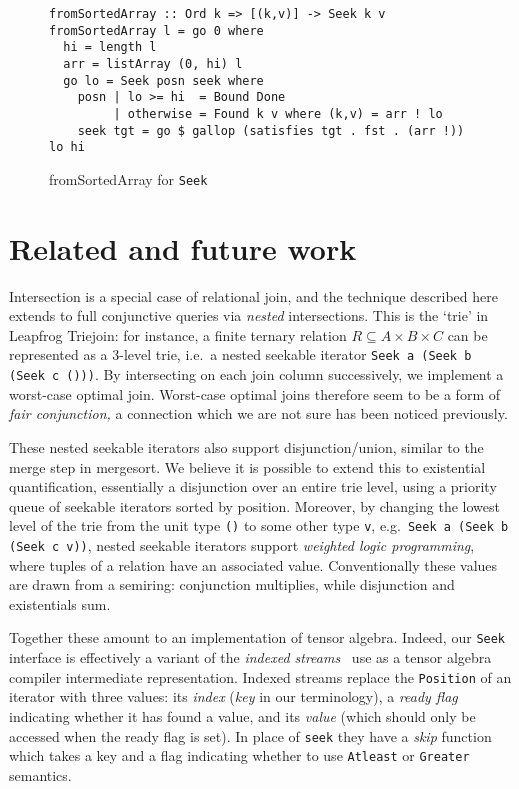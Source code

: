 \documentclass[acmsmall,screen,review,anonymous,dvipsnames,svgnames]{acmart}
\newcommand\hask[1]{\texttt{#1}}
\newcommand\ttt\texttt
\newcommand\todo[1]{{\color{Orange}#1}}
\renewcommand\todo[1]{{\color{IndianRed}#1}}
\renewcommand\todo[1]{\ignorespaces}
\begin{document}
\begin{figure}
  \begin{verbatim}
fromSortedArray :: Ord k => [(k,v)] -> Seek k v
fromSortedArray l = go 0 where
  hi = length l
  arr = listArray (0, hi) l
  go lo = Seek posn seek where
    posn | lo >= hi  = Bound Done
         | otherwise = Found k v where (k,v) = arr ! lo
    seek tgt = go $ gallop (satisfies tgt . fst . (arr !)) lo hi
  \end{verbatim}
  \caption{fromSortedArray for \hask{Seek}}
  \label{fig:seek-fromsortedarray}
\end{figure}


\section{Related and future work}

Intersection is a special case of relational join, and the technique described here extends to full conjunctive queries via \emph{nested} intersections.
This is the `trie' in Leapfrog Triejoin: for instance, a finite ternary relation $R \subseteq A \times B \times C$ can be represented as a 3-level trie, i.e.\ a nested seekable iterator \hask{Seek a (Seek b (Seek c ()))}.
By intersecting on each join column successively, we implement a worst-case optimal join.
Worst-case optimal joins therefore seem to be a form of \emph{fair conjunction,} a connection which we are not sure has been noticed previously.

These nested seekable iterators also support disjunction/union, similar to the merge step in mergesort.
We believe it is possible to extend this to existential quantification, essentially a disjunction over an entire trie level, using a priority queue of seekable iterators sorted by position.
Moreover, by changing the lowest level of the trie from the unit type \ttt{()} to some other type \ttt{v}, e.g.\ \hask{Seek a (Seek b (Seek c v))}, nested seekable iterators support \emph{weighted logic programming}, where tuples of a relation have an associated value.
Conventionally these values are drawn from a semiring: conjunction multiplies, while disjunction and existentials sum.

Together these amount to an implementation of tensor algebra.
Indeed, our \hask{Seek} interface is effectively a variant of the \emph{indexed streams}~\citet{indexed-streams} use as a tensor algebra compiler intermediate representation.
Indexed streams replace the \hask{Position} of an iterator with three values: its \emph{index} (\emph{key} in our terminology), a \emph{ready flag} indicating whether it has found a value, and its \emph{value} (which should only be accessed when the ready flag is set).
In place of \hask{seek} they have a \emph{skip} function which takes a key and a flag indicating whether to use \hask{Atleast} or \hask{Greater} semantics.
\todo{all their key/index types are bounded so they don't need \hask{Done}---is this accurate?}
\end{document}
